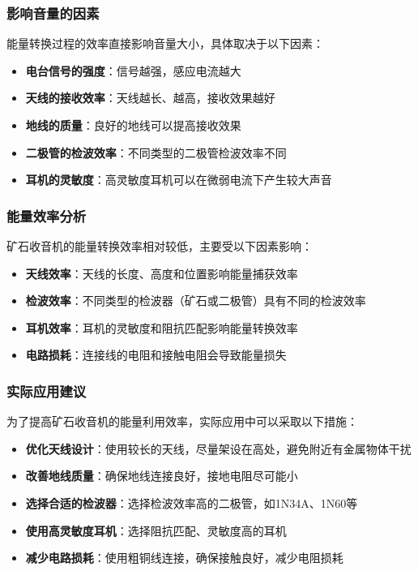 \documentclass[12pt,UTF8]{ctexbook}
\begin{document}
\subsubsection{影响音量的因素}
能量转换过程的效率直接影响音量大小，具体取决于以下因素：
\begin{itemize}[leftmargin=3.5em]
  \item \textbf{电台信号的强度}：信号越强，感应电流越大
  \item \textbf{天线的接收效率}：天线越长、越高，接收效果越好
  \item \textbf{地线的质量}：良好的地线可以提高接收效果
  \item \textbf{二极管的检波效率}：不同类型的二极管检波效率不同
  \item \textbf{耳机的灵敏度}：高灵敏度耳机可以在微弱电流下产生较大声音
\end{itemize}

\subsubsection{能量效率分析}
矿石收音机的能量转换效率相对较低，主要受以下因素影响：
\begin{itemize}[leftmargin=3.5em]
  \item \textbf{天线效率}：天线的长度、高度和位置影响能量捕获效率
  \item \textbf{检波效率}：不同类型的检波器（矿石或二极管）具有不同的检波效率
  \item \textbf{耳机效率}：耳机的灵敏度和阻抗匹配影响能量转换效率
  \item \textbf{电路损耗}：连接线的电阻和接触电阻会导致能量损失
\end{itemize}

\subsubsection{实际应用建议}
为了提高矿石收音机的能量利用效率，实际应用中可以采取以下措施：
\begin{itemize}[leftmargin=3.5em]
  \item \textbf{优化天线设计}：使用较长的天线，尽量架设在高处，避免附近有金属物体干扰
  \item \textbf{改善地线质量}：确保地线连接良好，接地电阻尽可能小
  \item \textbf{选择合适的检波器}：选择检波效率高的二极管，如1N34A、1N60等
  \item \textbf{使用高灵敏度耳机}：选择阻抗匹配、灵敏度高的耳机
  \item \textbf{减少电路损耗}：使用粗铜线连接，确保接触良好，减少电阻损耗
\end{itemize}
\end{document}
